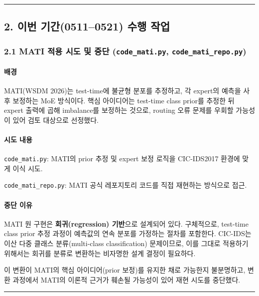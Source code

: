 \medskip\hrule\medskip
\subsection{2. 이번 기간(0511–0521) 수행 작업}
\subsubsection{2.1 MATI 적용 시도 및 중단 (\texttt{code\_\allowbreak{}\allowbreak{}mat\allowbreak{}i.\allowbreak{}py}, \texttt{code\_\allowbreak{}\allowbreak{}mat\allowbreak{}i\_\allowbreak{}\allowbreak{}repo.\allowbreak{}p\allowbreak{}y})}
\paragraph{배경}
MATI(WSDM 2026)는 test-time에 불균형 분포를 추정하고, 각 expert의 예측을 사후 보정하는 MoE 방식이다. 핵심 아이디어는 test-time class prior를 추정한 뒤 expert 출력에 곱해 imbalance를 보정하는 것으로, routing 오류 문제를 우회할 가능성이 있어 검토 대상으로 선정했다.

\paragraph{시도 내용}
\par\noindent \textbullet\enspace \texttt{code\_\allowbreak{}\allowbreak{}mat\allowbreak{}i.\allowbreak{}py}: MATI의 prior 추정 및 expert 보정 로직을 CIC-IDS2017 환경에 맞게 이식 시도.


\par\noindent \textbullet\enspace \texttt{code\_\allowbreak{}\allowbreak{}mat\allowbreak{}i\_\allowbreak{}\allowbreak{}repo.\allowbreak{}p\allowbreak{}y}: MATI 공식 레포지토리 코드를 직접 재현하는 방식으로 접근.


\paragraph{중단 이유}
MATI 원 구현은 \textbf{회귀(regression) 기반}으로 설계되어 있다. 구체적으로, test-time class prior 추정 과정이 예측값의 연속 분포를 가정하는 절차를 포함한다. CIC-IDS는 이산 다중 클래스 분류(multi-class classification) 문제이므로, 이를 그대로 적용하기 위해서는 회귀를 분류로 변환하는 비자명한 설계 결정이 필요하다.

이 변환이 MATI의 핵심 아이디어(prior 보정)를 유지한 채로 가능한지 불분명하고, 변환 과정에서 MATI의 이론적 근거가 훼손될 가능성이 있어 재현 시도를 중단했다.


\medskip\hrule\medskip
